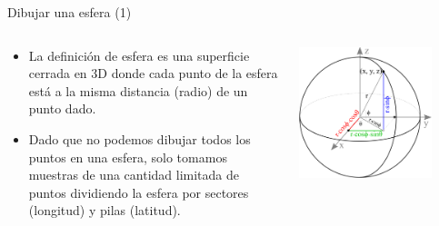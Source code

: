 \documentclass[aspectratio=169,compress]{beamer}
\begin{document}
\begin{frame}{Dibujar una esfera (1)}
\begin{columns}
\begin{column}{0.5\textwidth}
\begin{itemize}
\item La definición de esfera es una superficie cerrada en 3D donde cada punto de la esfera está a la misma distancia (radio) de un punto dado.
\item Dado que no podemos dibujar todos los puntos en una esfera, solo tomamos muestras de una cantidad limitada de puntos dividiendo la esfera por sectores (longitud) y pilas (latitud).
\end{itemize}

\end{column}
\begin{column}{0.5\textwidth}
\begin{center}
 \includegraphics[width=0.8\textwidth]{FigsOpenGL/gl_sphere01}
 \end{center}
\end{column}
\end{columns}


\end{frame}
\end{document}
